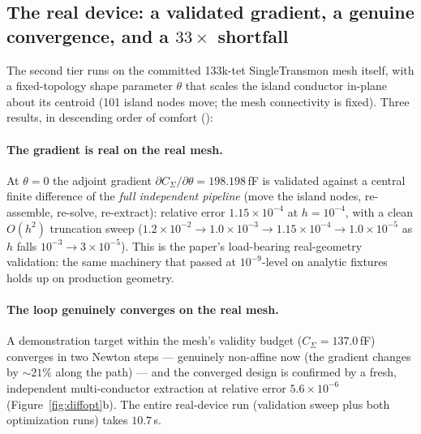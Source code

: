 \documentclass{anvil-paper}
\begin{document}
\subsection{The real device: a validated gradient, a genuine
convergence, and a \texorpdfstring{$33\times$}{33x} shortfall}
\label{sec:optdemo-pad}

The second tier runs on the committed 133k-tet SingleTransmon mesh
itself, with a fixed-topology shape parameter $\theta$ that scales the
island conductor in-plane about its centroid (101 island nodes move;
the mesh connectivity is fixed). Three results, in descending order of
comfort
():

\paragraph{The gradient is real on the real mesh.} At $\theta = 0$ the
adjoint gradient $\partial C_\Sigma/\partial\theta = 198.198$\,fF is
validated against a central finite difference of the \emph{full
independent pipeline} (move the island nodes, re-assemble, re-solve,
re-extract): relative error $1.15\times10^{-4}$ at $h = 10^{-4}$, with a
clean $O(h^2)$ truncation sweep ($1.2\times10^{-2} \to 1.0\times10^{-3}
\to 1.15\times10^{-4} \to 1.0\times10^{-5}$ as $h$ falls
$10^{-3} \to 3\times10^{-5}$). This is the paper's load-bearing
real-geometry validation: the same machinery that passed at
$10^{-9}$-level on analytic fixtures holds up on production geometry.

\paragraph{The loop genuinely converges on the real mesh.} A
demonstration target within the mesh's validity budget ($C_\Sigma =
137.0$\,fF) converges in two Newton steps --- genuinely non-affine now
(the gradient changes by ${\sim}21\%$ along the path) --- and the
converged design
is confirmed by a fresh, independent multi-conductor extraction at
relative error $5.6\times10^{-6}$ (Figure~\ref{fig:diffopt}b). The
entire real-device run (validation sweep plus both optimization runs)
takes $10.7$\,s.
\end{document}
